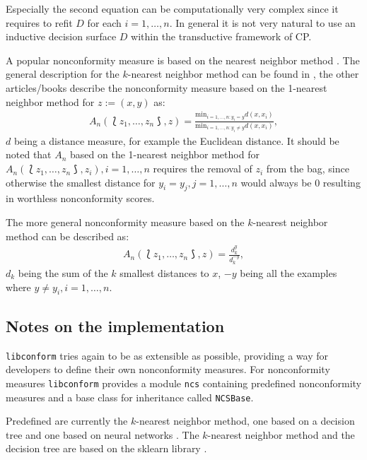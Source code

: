 \documentclass[twoside,11pt]{article}
\def\libconform{\texttt{libconform}}
\begin{document}
Especially the second equation can be computationally very
complex since it requires to refit $D$ for each
$i = 1,\dots,n$. In general it is not very natural to
use an inductive decision surface $D$ within the
transductive framework of CP.

A popular nonconformity measure is based on the nearest
neighbor method \citep[see][]{alrw,shafer_et_al_2008,cprml,
  smirnov_et_al_2009}.
The general description for the $k$-nearest neighbor method
can be found in \citet{smirnov_et_al_2009}, the other
articles/books describe the nonconformity measure based on
the 1-nearest neighbor method for $z:=(x,y)$ as:
\begin{align*}
  A_n(\Lbag z_1,\dots,z_n \Rbag, z) =
  \frac{\text{min}_{i=1,\dots,n:y_i = y} d(x,x_i)}
       {\text{min}_{i=1,\dots,n:y_i \neq y} d(x,x_i)},
\end{align*}
$d$ being a distance measure, for example the Euclidean
distance. It should be noted that $A_n$ based on the
1-nearest neighbor method for
$A_n(\Lbag z_1,\dots,z_n \Rbag, z_i), i=1,\dots,n$ requires
the removal of $z_i$ from the bag, since otherwise the
smallest distance for $y_i = y_j,j=1,\dots,n$ would always
be 0 resulting in worthless nonconformity scores.

The more general nonconformity measure based on the
$k$-nearest neighbor method can be described as:
\begin{align*}
  A_n(\Lbag z_1,\dots,z_n \Rbag, z)=\frac{d_k^y}{d_k^{-y}},
\end{align*}
$d_k$ being the sum of the $k$ smallest distances to $x$,
$-y$ being all the examples where
$y \neq y_i, i = 1,\dots,n$.

\subsection*{Notes on the implementation}

\libconform{} tries again to be as extensible as possible,
providing a way for developers to define their own
nonconformity measures. For nonconformity measures
\libconform{} provides a module \texttt{ncs} containing
predefined nonconformity measures and a base class for
inheritance called \texttt{NCSBase}.

Predefined are currently the $k$-nearest neighbor method,
one based on a decision tree \citep[see][Chapter 4]{alrw}
and one based on neural networks
\citep[see][Chapter 4]{papadopoulos_et_al_2007,alrw}.
The $k$-nearest neighbor method and the decision tree
are based on the sklearn library
\citep[see][]{sklearn_api}.
\end{document}
